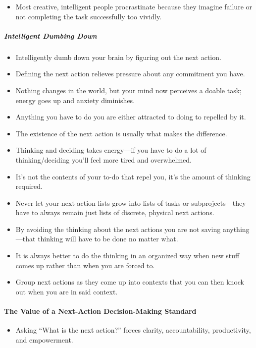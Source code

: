 \documentclass{article}
\begin{document}
\begin{itemize}
 \item Most creative, intelligent people procrastinate because they imagine failure or not completing the task successfully too vividly.
\end{itemize}

\subparagraph{Intelligent Dumbing Down}

\begin{itemize}
 \item Intelligently dumb down your brain by figuring out the next action.
 \item Defining the next action relieves pressure about any commitment you have.
 \item Nothing changes in the world, but your mind now perceives a doable task; energy goes up and anxiety diminishes.
 \item Anything you have to do you are either attracted to doing to repelled by it.
 \item The existence of the next action is usually what makes the difference.
 \item Thinking and deciding takes energy---if you have to do a lot of thinking/deciding you'll feel more tired and overwhelmed.
 \item It's not the contents of your to-do that repel you, it's the amount of thinking required.
 \item Never let your next action lists grow into lists of tasks or subprojects---they have to always remain just lists of discrete, physical next actions.
 \item By avoiding the thinking about the next actions you are not saving any\-thing---that thinking will have to be done no matter what.
 \item It is always better to do the thinking in an organized way when new stuff comes up rather than when you are forced to.
 \item Group next actions as they come up into contexts that you can then knock out when you are in said context.
\end{itemize}

\paragraph{The Value of a Next-Action Decision-Making Standard}

\begin{itemize}
 \item Asking ``What is the next action?'' forces clarity, accountability, productivity, and empowerment.
\end{itemize}
\end{document}
